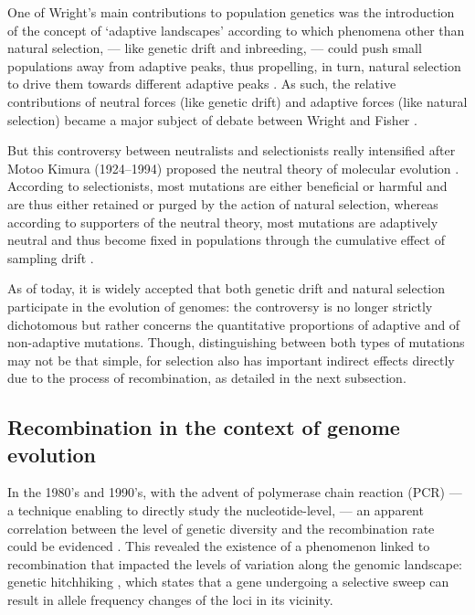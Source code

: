 One of Wright's main contributions to population genetics was the introduction of the concept of ‘adaptive landscapes’ according to which phenomena other than natural selection, — like genetic drift and inbreeding, — could push small populations away from adaptive peaks, thus propelling, in turn, natural selection to drive them towards different adaptive peaks \citep{wright1932roles}.
As such, the relative contributions of neutral forces (like genetic drift) and adaptive forces (like natural selection) became a major subject of debate between Wright and Fisher \citep{plutynski2007drift}.

But this controversy between neutralists and selectionists really intensified after Motoo Kimura (1924--1994) proposed the neutral theory of molecular evolution \citep{kimura1968evolutionary,kimura1991neutral,kimura1986dna}.
According to selectionists, most mutations are either beneficial or harmful and are thus either retained or purged by the action of natural selection, whereas according to supporters of the neutral theory, most mutations are adaptively neutral and thus become fixed in populations through the cumulative effect of sampling drift \citep{lewin1996patterns}.

As of today, it is widely accepted that both genetic drift and natural selection participate in the evolution of genomes: the controversy is no longer strictly dichotomous but rather concerns the quantitative proportions of adaptive and of non-adaptive mutations.
Though, distinguishing between both types of mutations may not be that simple, for selection also has important indirect effects directly due to the process of recombination, as detailed in the next subsection.



\subsection{Recombination in the context of genome evolution}

In the 1980's and 1990's, with the advent of polymerase chain reaction (PCR) — a technique enabling to directly study the nucleotide-level, — an apparent correlation between the level of genetic diversity and the recombination rate could be evidenced \citep{begun1992levels}.
This revealed the existence of a phenomenon linked to recombination that impacted the levels of variation along the genomic landscape: genetic hitchhiking \citep{smith1974hitchhiking}, which states that a gene undergoing a selective sweep can result in allele frequency changes of the loci in its vicinity.

